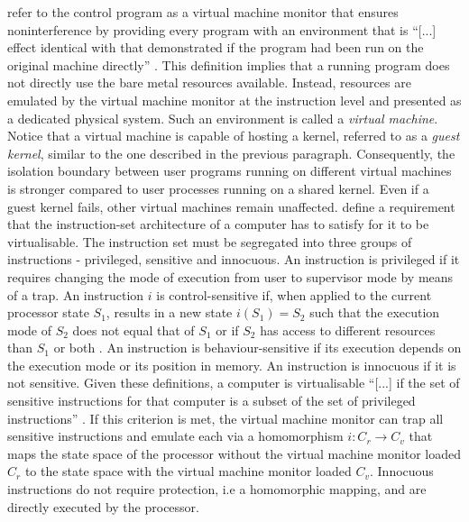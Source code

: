 \textcite{10.1145/361011.361073} refer to the control program as a virtual machine monitor that 
ensures noninterference by providing every program with an environment that is \enquote{[...] effect
identical with that demonstrated if the program had been run on the original machine directly} 
\cite[2]{10.1145/361011.361073}. This definition implies that a running program does not directly use
the bare metal resources available. Instead, resources are emulated by the virtual machine monitor at
the instruction level and presented as a dedicated physical system. Such an environment is called 
a \textit{virtual machine}. Notice that a virtual machine is capable of hosting a kernel, referred to 
as a \textit{guest kernel}, similar to the one described in the previous paragraph. Consequently, the
isolation boundary between user programs running on different virtual machines is stronger compared to 
user processes running on a shared kernel. Even if a guest kernel fails, other virtual machines remain unaffected.
\textcite{10.1145/361011.361073} define a requirement that the instruction-set architecture of a computer
has to satisfy for it to be virtualisable. The instruction set must be segregated into three groups of
instructions - privileged, sensitive and innocuous. An instruction is privileged if it requires changing
the mode of execution from user to supervisor mode by means of a trap. An instruction $i$ is control-sensitive 
if, when applied to the current processor state $S_1$, results in a new state $i(S_{1}) = S_{2}$ such 
that the execution mode of $S_{2}$ does not equal that of $S_{1}$ or if $S_{2}$ has access to different 
resources than $S_1$ or both \cite{10.1145/361011.361073}. An instruction is behaviour-sensitive if its 
execution depends on the execution mode or its position in memory. An instruction is innocuous if it is 
not sensitive. Given these definitions, a computer is virtualisable \enquote{[...] if the set of sensitive 
instructions for that computer is a subset of the set of privileged instructions} \cite[6]{10.1145/361011.361073}.
If this criterion is met, the virtual machine monitor can trap all sensitive instructions and emulate 
each via a homomorphism $i: C_{r} \rightarrow C_{v}$ that maps the state space of the processor without
the virtual machine monitor loaded $C_{r}$ to the state space with the virtual machine monitor loaded 
$C_{v}$. Innocuous instructions do not require protection, i.e a homomorphic mapping, and are directly
executed by the processor.

